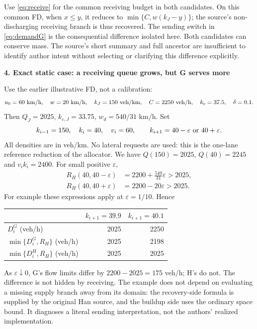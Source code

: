 \documentclass[10pt,a4paper]{article}
\newcommand{\head}[1]{\par\medskip\textbf{#1}\par}
\begin{document}
Use \eqref{eq:receive} for the common receiving budget in both candidates.
On this common FD, when $x\leq y$, it reduces to
$\min\{C,w(k_J-y)\}$; the source's non-discharging receiving branch is thus
recovered. The sending switch in \eqref{eq:demandG} is the consequential
difference isolated here. Both candidates can conserve mass. The source's
short summary and full ancestor are insufficient to identify author intent
without selecting or clarifying this difference explicitly.

\head{4. Exact static case: a receiving queue grows, but G serves more}
Use the earlier illustrative FD, not a calibration:
\begin{equation}
 u_0=60\ {\rm km/h},\quad w=20\ {\rm km/h},\quad k_J=150\ {\rm veh/km},
 \quad C=2250\ {\rm veh/h},\quad k_c=37.5,\quad\delta=0.1.
\end{equation}
Then $Q_J=2025$, $k_{c,J}=33.75$, $w_d=540/31$ km/h. Set
\begin{equation}
 k_{i-1}=150,\quad k_i=40,\quad v_i=60,\qquad
 k_{i+1}=40-\varepsilon\ \hbox{or}\ 40+\varepsilon.
\end{equation}
All densities are in veh/km. No lateral requests are used: this is the
one-lane reference reduction of the allocator. We have $Q(150)=2025$,
$Q(40)=2245$ and $v_i k_i=2400$. For small positive $\varepsilon$,
\begin{align}
 R_H(40,40-\varepsilon)&=2200+\frac{540}{31}\varepsilon>2025,\nonumber\\
 R_H(40,40+\varepsilon)&=2200-20\varepsilon>2025. \label{eq:receivesides}
\end{align}
For example these expressions apply at $\varepsilon=1/10$. Hence
\begin{center}
\begin{tabular}{lrr}
\toprule
 & $k_{i+1}=39.9$ & $k_{i+1}=40.1$\\
\midrule
$D^G_i$ (veh/h) & 2025 & 2250\\
$\min\{D^G_i,R_H\}$ (veh/h) & 2025 & 2198\\
$\min\{D^H_i,R_H\}$ (veh/h) & 2025 & 2025\\
\bottomrule
\end{tabular}
\end{center}
As $\varepsilon\downarrow0$, G's flow limits differ by $2200-2025=175$
veh/h; H's do not. The difference is not hidden by receiving. The example
does not depend on evaluating a missing supply branch away from its domain:
the recovery-side formula is supplied by the original Han source, and the
buildup side uses the ordinary space bound. It diagnoses a literal sending
interpretation, not the authors' realized implementation.
\end{document}
